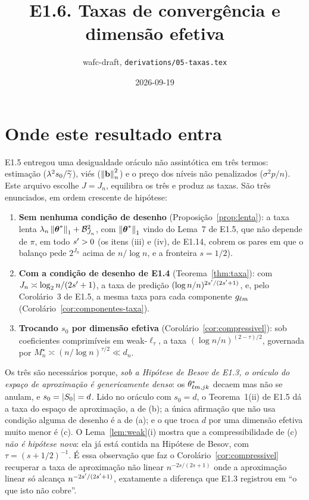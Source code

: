 \documentclass[11pt,a4paper]{article}
\title{E1.6. Taxas de convergência e dimensão efetiva}
\author{wafc-draft, \texttt{derivations/05-taxas.tex}}
\date{2026-09-19}
\newcommand{\bb}{\mathbf{b}}
\newcommand{\gtil}{\widetilde{\gamma}}
\newcommand{\Mstar}{M^{\star}}
\begin{document}
\maketitle

\section*{Onde este resultado entra}

E1.5 entregou uma desigualdade oráculo não assintótica em três termos:
estimação ($\pen^{2}s_{0}/\gtil$), viés ($\normn{\bb}^{2}$) e o preço dos
níveis não penalizados ($\sigma^{2}p/n$). Este arquivo escolhe $J = J_{n}$,
equilibra os três e produz as taxas. São três enunciados, em ordem crescente
de hipótese:

\begin{enumerate}[label=(\alph*), leftmargin=*, nosep]
  \item \textbf{Sem nenhuma condição de desenho} (Proposição~\ref{prop:lenta}):
    a taxa lenta $\lambda_{n}\left\lVert \boldsymbol{\theta}^{*} \right\rVert_{1} + \mathcal{B}_{J_{n}}^{2}$, com
    $\left\lVert \boldsymbol{\theta}^{*} \right\rVert_{1}$ vindo do Lema~7 de E1.5, que não depende de $\pi$,
    em todo $s' > 0$ (os itens (iii) e (iv), de E1.14, cobrem os pares em
    que o balanço pede $2^{J_{n}}$ acima de $n/\log n$, e a fronteira $s = 1/2$).
  \item \textbf{Com a condição de desenho de E1.4} (Teorema~\ref{thm:taxa}):
    com $J_{n} \asymp \log_{2}n/(2s'+1)$, a taxa de predição
    $(\log n/n)^{2s'/(2s'+1)}$, e, pelo Corolário~3 de E1.5, a mesma
    taxa para cada componente $g_{\ell m}$
    (Corolário~\ref{cor:componentes-taxa}).
  \item \textbf{Trocando $s_{0}$ por dimensão efetiva}
    (Corolário~\ref{cor:compressivel}): sob coeficientes comprimíveis em
    weak-$\ell_{\tau}$, a taxa $(\log n/n)^{(2-\tau)/2}$, governada por
    $\Mstar_{n} \asymp (n/\log n)^{\tau/2} \ll d_{n}$.
\end{enumerate}

Os três são necessários porque, \emph{sob a Hipótese de Besov de E1.3, o
oráculo do espaço de aproximação é genericamente denso}: os
$\theta^{*}_{\ell m,jk}$ decaem mas não se anulam, e
$s_{0} = |S_{0}| = d$. Lido no oráculo com $s_{0} = d$, o Teorema~1(ii) de
E1.5 dá a taxa do espaço de aproximação, a de (b); a única
afirmação que não usa condição alguma de desenho é a de (a); e o que troca
$d$ por uma dimensão efetiva muito menor é (c). O Lema~\ref{lem:weak}(i)
mostra que a compressibilidade de (c) \emph{não é hipótese nova}: ela já
está contida na Hipótese de Besov, com $\tau = (s+1/2)^{-1}$. É essa
observação que faz o Corolário~\ref{cor:compressivel} recuperar a taxa de
aproximação não linear $n^{-2s/(2s+1)}$ onde a aproximação linear só alcança
$n^{-2s'/(2s'+1)}$, exatamente a diferença que E1.3 registrou em ``o
que isto não cobre''.
\end{document}

